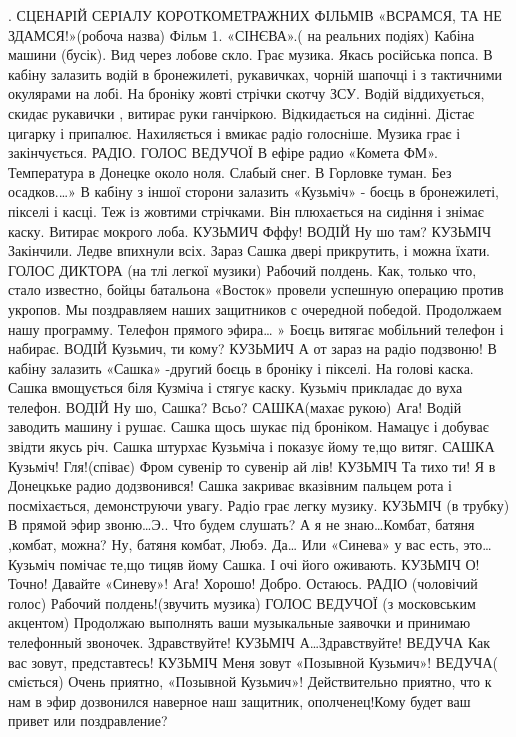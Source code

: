 . СЦЕНАРІЙ СЕРІАЛУ  КОРОТКОМЕТРАЖНИХ  ФІЛЬМІВ  «ВСРАМСЯ, ТА НЕ ЗДАМСЯ!»(робоча назва)
Фільм 1.
«СІНЄВА».( на реальних подіях)
Кабіна машини (бусік). Вид через лобове скло. 
Грає музика. Якась російська попса.
В кабіну залазить водій в бронежилеті, рукавичках, чорній шапочці і з тактичними окулярами на лобі. На броніку жовті стрічки скотчу ЗСУ. Водій віддихується, скидає рукавички , витирає руки ганчіркою. Відкидається на сидінні. Дістає цигарку і припалює.
Нахиляється і вмикає радіо голосніше. Музика грає і закінчується.
РАДІО. ГОЛОС ВЕДУЧОЇ
В ефіре радио «Комета ФМ». 
Температура в Донецке около ноля. 
Слабый снег. В Горловке туман. Без осадков.…»
В кабіну з іншої сторони залазить «Кузьміч» - боєць в бронежилеті, пікселі і касці. Теж із жовтими стрічками.
Він плюхається на сидіння і знімає каску. Витирає мокрого лоба.
КУЗЬМИЧ
Фффу!
ВОДІЙ
Ну шо там?
КУЗЬМІЧ
Закінчили. Ледве впихнули всіх. Зараз Сашка двері прикрутить, і  можна їхати.
ГОЛОС ДИКТОРА (на тлі легкої музики)
Рабочий полдень. Как, только что, стало известно, бойцы батальона «Восток» провели успешную операцию против укропов. Мы поздравляем наших защитников с очередной победой. Продолжаем нашу программу. Телефон прямого эфира…  »
Боєць витягає мобільний телефон і набирає.
ВОДІЙ
Кузьмич, ти кому?
КУЗЬМИЧ
А от зараз на радіо подзвоню!
В кабіну залазить «Сашка» -другий боєць в броніку і пікселі. На голові каска. Сашка вмощується біля Кузміча і стягує каску. Кузьміч прикладає до вуха телефон.
ВОДІЙ
Ну шо, Сашка? Всьо?
САШКА(махає рукою)
Ага!
Водій заводить машину і рушає.
Сашка щось шукає під броніком. Намацує і добуває звідти якусь річ. Сашка штурхає Кузьміча і показує йому те,що витяг.
САШКА
Кузьміч! Гля!(співає) Фром сувенір то сувенір ай лів!
КУЗЬМІЧ
Та тихо ти! Я в Донецкьке радио додзвонився!
Сашка закриває вказівним пальцем рота і посміхається, демонструючи увагу. 
Радіо грає легку музику.
КУЗЬМІЧ (в трубку)
В прямой эфир звоню…Э.. Что будем слушать? А я не знаю…Комбат, батяня ,комбат, можна? Ну, батяня комбат, Любэ. Да…
Или «Синева» у вас есть, это…
Кузьміч помічає те,що тицяв йому Сашка. І очі його оживають.
КУЗЬМІЧ
О! Точно! Давайте «Синеву»!  Ага! Хорошо! Добро. Остаюсь.
РАДІО (чоловічий голос)
Рабочий полдень!(звучить музика)
ГОЛОС ВЕДУЧОЇ (з московським акцентом)
Продолжаю выполнять ваши музыкальные заявочки и принимаю телефонный звоночек. Здравствуйте!
КУЗЬМІЧ
А…Здравствуйте!
ВЕДУЧА
Как вас зовут, представтесь!
КУЗЬМІЧ
Меня зовут «Позывной Кузьмич»!
ВЕДУЧА( сміється)
Очень приятно, «Позывной Кузьмич»! 
Действительно приятно, что к нам в эфир дозвонился наверное наш защитник, ополченец!Кому будет ваш привет или поздравление? 
